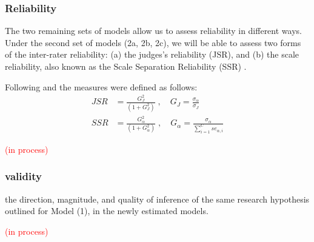 \subsubsection{Reliability}
%
The two remaining sets of models allow us to assess reliability in different ways. Under the second set of models (2a, 2b, 2c), we will be able to assess two forms of the inter-rater reliability: (a) the judges's reliability (JSR), and (b) the scale reliability, also known as the Scale Separation Reliability (SSR) \citep{Bramley_2015}. 

Following \citet{Fisher_1992} and \citet{Wright_1996} the measures were defined as follows:
%
\begin{align}
	JSR &= \frac{ G^{2}_{J} }{ (1 + G^{2}_{J}) }\; , \quad G_{J} = \frac{ \sigma_{\alpha} } { \sigma_{J} } \label{eq:JSR} \\
	SSR &= \frac{ G^{2}_{\alpha} }{ (1 + G^{2}_{\alpha}) }\; , \quad G_{\alpha} = \frac{ \sigma_{\alpha} } { \sum_{i=1}^{C} se_{\alpha, i} } \label{eq:SSR}
\end{align}
%

\textcolor{red}{(in process)}

\begin{comment}
	compare the Scale Separation Reliability (SSR, an inter-rater reliability measure), coming from CJ methods, with others for other methods
	
	- No intra-rater reliability, also known as test-retest reliability (Verhavert_2018, Reliability_wiki_2022) 
	- No Inter-method reliability,  assesses the degree to which test scores are consistent when there is a variation in the methods or instruments used (Verhavert_2018, Reliability_wiki_2022) 
	- No comparison of SSR vs the true correlation of the latent scale and entropy measures 
	* Justification: (Verhavert_2018, p. 156) " simulation studies could resolve the inconclusiveness regarding the SSR as a correlation with the truth."
\end{comment}
%
%
\subsubsection{validity}
%
the direction, magnitude, and quality of inference of the same research hypothesis outlined for Model (1), in the newly estimated models.

\textcolor{red}{(in process)}

\begin{comment}
	correlate latent scores (from different methods) with entropy measures (see research proposal)
	
	\textbf{critique:} What about decision statements or think at loud rating process? (is it possible), \citet{Lesterhuis_2018} has shown their usefulness, while \citet{Boonen_et_al_2020} signals the need to know about the inner working of judgment processes.
\end{comment}
%
%
